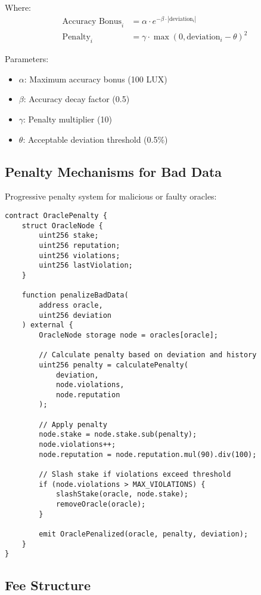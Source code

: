 \documentclass[11pt]{article}
\begin{document}
Where:
\begin{align}
\text{Accuracy Bonus}_i &= \alpha \cdot e^{-\beta \cdot |\text{deviation}_i|} \\
\text{Penalty}_i &= \gamma \cdot \max(0, \text{deviation}_i - \theta)^2
\end{align}

Parameters:
\begin{itemize}
    \item $\alpha$: Maximum accuracy bonus (100 LUX)
    \item $\beta$: Accuracy decay factor (0.5)
    \item $\gamma$: Penalty multiplier (10)
    \item $\theta$: Acceptable deviation threshold (0.5\%)
\end{itemize}

\subsection{Penalty Mechanisms for Bad Data}

Progressive penalty system for malicious or faulty oracles:

\begin{lstlisting}[caption={Oracle Penalty System}]
contract OraclePenalty {
    struct OracleNode {
        uint256 stake;
        uint256 reputation;
        uint256 violations;
        uint256 lastViolation;
    }
    
    function penalizeBadData(
        address oracle,
        uint256 deviation
    ) external {
        OracleNode storage node = oracles[oracle];
        
        // Calculate penalty based on deviation and history
        uint256 penalty = calculatePenalty(
            deviation,
            node.violations,
            node.reputation
        );
        
        // Apply penalty
        node.stake = node.stake.sub(penalty);
        node.violations++;
        node.reputation = node.reputation.mul(90).div(100);
        
        // Slash stake if violations exceed threshold
        if (node.violations > MAX_VIOLATIONS) {
            slashStake(oracle, node.stake);
            removeOracle(oracle);
        }
        
        emit OraclePenalized(oracle, penalty, deviation);
    }
}
\end{lstlisting}

\subsection{Fee Structure}
\end{document}
